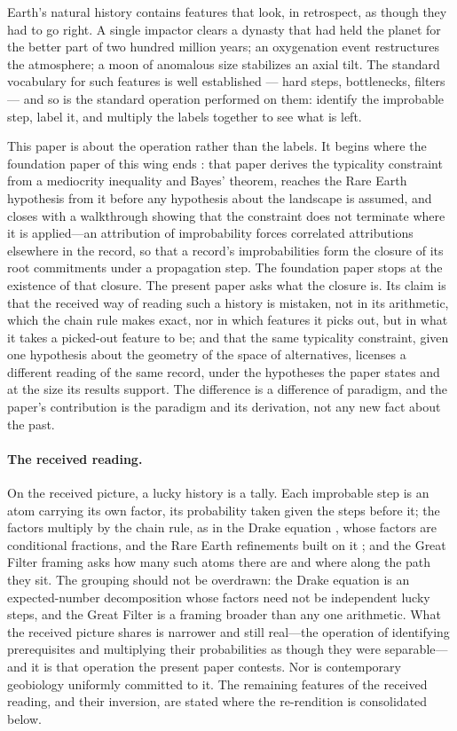 \documentclass[11pt]{article}
\theoremstyle{definition}
\begin{document}
Earth's natural history contains features that look, in retrospect, as though they had to go right. A single impactor clears a dynasty that had held the planet for the better part of two hundred million years; an oxygenation event restructures the atmosphere; a moon of anomalous size stabilizes an axial tilt. The standard vocabulary for such features is well established --- hard steps, bottlenecks, filters --- and so is the standard operation performed on them: identify the improbable step, label it, and multiply the labels together to see what is left.

This paper is about the operation rather than the labels. It begins where the foundation paper of this wing ends \cite{NexicFoundation}: that paper derives the typicality constraint from a mediocrity inequality and Bayes' theorem, reaches the Rare Earth hypothesis from it before any hypothesis about the landscape is assumed, and closes with a walkthrough showing that the constraint does not terminate where it is applied---an attribution of improbability forces correlated attributions elsewhere in the record, so that a record's improbabilities form the closure of its root commitments under a propagation step. The foundation paper stops at the existence of that closure. The present paper asks what the closure is. Its claim is that the received way of reading such a history is mistaken, not in its arithmetic, which the chain rule makes exact, nor in which features it picks out, but in what it takes a picked-out feature to be; and that the same typicality constraint, given one hypothesis about the geometry of the space of alternatives, licenses a different reading of the same record, under the hypotheses the paper states and at the size its results support. The difference is a difference of paradigm, and the paper's contribution is the paradigm and its derivation, not any new fact about the past.

\paragraph{The received reading.} On the received picture, a lucky history is a tally. Each improbable step is an atom carrying its own factor, its probability taken given the steps before it; the factors multiply by the chain rule, as in the Drake equation \cite{Drake1961}, whose factors are conditional fractions, and the Rare Earth refinements built on it \cite{ward2000rare}; and the Great Filter framing \cite{hanson1998greatfilter} asks how many such atoms there are and where along the path they sit. The grouping should not be overdrawn: the Drake equation is an expected-number decomposition whose factors need not be independent lucky steps, and the Great Filter is a framing broader than any one arithmetic. What the received picture shares is narrower and still real---the operation of identifying prerequisites and multiplying their probabilities as though they were separable---and it is that operation the present paper contests. Nor is contemporary geobiology uniformly committed to it. The remaining features of the received reading, and their inversion, are stated where the re-rendition is consolidated below.
\end{document}
